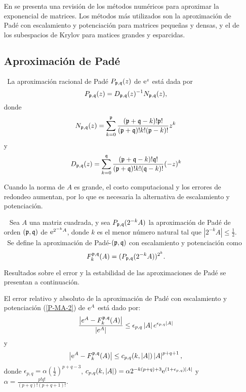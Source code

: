 En \cite{golub2013matrix} se presenta una revisión de los métodos numéricos
para aproximar
la exponencial de matrices. Los métodos más utilizados son la aproximación de Padé con escalamiento
y potenciación para matrices pequeñas y densas, y el de los subespacios de Krylov para matices grandes y esparcidas.


\subsection{Aproximación de Padé}\label{section:pade-approx}

\begin{definition}
    \cite{golub2013matrix}~La aproximación racional de Padé $P_{\mathfrak{p},\mathfrak{q}}(z)$
    de $\mathrm{e}^{z}$ está dada por 
    \begin{equation*}
    P_{\mathfrak{p},\mathfrak{q}}(z)=D_{\mathfrak{p},\mathfrak{q}}(z)^{-1}N_{\mathfrak{p},\mathfrak{q}}(z),  \label{FORM PADE}
    \end{equation*}%
    donde 
    \[
    N_{\mathfrak{p},\mathfrak{q}}(z)=\sum\limits_{k=0}^{\mathfrak{p}}\frac{(\mathfrak{p}+\mathfrak{q}-k)!\mathfrak{p}!}{(\mathfrak{p}+\mathfrak{q})!k!(\mathfrak{p}-k)!}z^k
    \]%
    y 
    \[
    D_{\mathfrak{p},\mathfrak{q}}(z)=\sum\limits_{k=0}^{\mathfrak{q}}\frac{(\mathfrak{p}+\mathfrak{q}-k)!\mathfrak{q}!}{(\mathfrak{p}+\mathfrak{q})!k!(\mathfrak{q}-k)!}(-z)^k
    \]
\end{definition}

Cuando la norma de $A$ es grande, el costo computacional y los errores de redondeo aumentan, por lo que
es necesaria la alternativa de escalamiento y potenciación.

\begin{definition}\cite{golub2013matrix}~
    Sea $A$ una matriz cuadrada, y sea $P_{\pf,\qf}(2^{-k}A%
    )$ la aproximación de Padé de orden $(\mathfrak{p},\mathfrak{q})\ $de $\me{2^{-k}A%
    }$, donde $k$ es el menor número natural tal que $\left\vert 2^{-k}A%
    \right\vert \leq \frac{1}{2}$. \ Se define la aproximación de  Padé-$(\mathfrak{p},\mathfrak{q})$ con escalamiento y potenciación como 
    \begin{equation}
    F_{k}^{\mathfrak{p},\mathfrak{q}}(A)=(P_{\mathfrak{p},\mathfrak{q}}(2^{-k}A))^{2^{k}}.
    \label{P-MA-2}
    \end{equation}
\end{definition}

Resultados sobre el error y la estabilidad de las aproximaciones de Padé se presentan a continuación.

\begin{theorem}
    \label{Conv. Pade}\cite{jimenez2012convergence} El error
    relativo y absoluto de la aproximación de Padé con escalamiento y
    potenciación (\ref{P-MA-2}) de $\mathrm{e}^{A}$ está dado por: 
    \[
    \frac{\left\vert e^{A}-F_{k}^{\mathfrak{p},\mathfrak{q}}(A)\right\vert 
    }{\left\vert e^{A}\right\vert }\leq \epsilon _{p,q}\left\vert 
    A\right\vert e^{\epsilon _{p,q}\left\vert A\right\vert }
    \]%
    y 
    \begin{equation}
    \left\vert \mathrm{e}^{A}-F_{k}^{\mathfrak{p},\mathfrak{q}}(A)\right\vert \leq
    c_{p,q}(k,\left\vert A\right\vert )\left\vert A\right\vert
    ^{p+q+1}, \label{errpade}
    \end{equation}
    donde $\epsilon _{p,q}=\alpha (\frac{1}{2})^{p+q-3}$, $%
    c_{p,q}(k,\left\vert A\right\vert )=\alpha
    2^{-k(p+q)+3}\me{(1+\epsilon _{p,q})\left\vert A\right\vert }$ y $%
    \alpha =\frac{p!q!}{(p+q)!(p+q+1)!}$.
\end{theorem}

